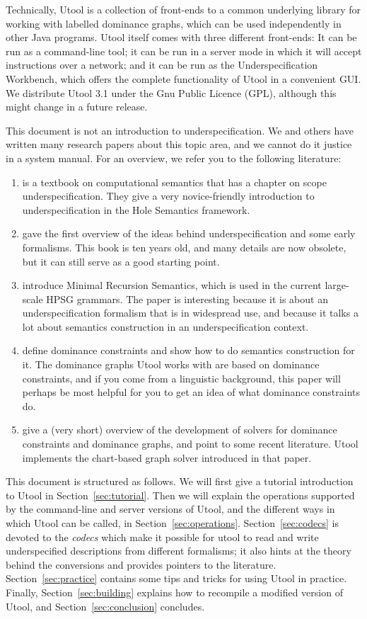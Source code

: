 Technically, Utool is a collection of front-ends to a common
underlying library for working with labelled dominance graphs, which
can be used independently in other Java programs.  Utool itself comes with three different front-ends: It can be run as a command-line tool; it can be run in a server mode in which it will accept instructions over a network; and it can be run as the Underspecification Workbench, which offers the complete functionality of Utool in a convenient GUI. We distribute Utool 3.1 under the Gnu Public Licence
(GPL), although this might change in a future release.

This document is not an introduction to underspecification. We and
others have written many research papers about this topic area, and we
cannot do it justice in a system manual. For an overview, we refer you
to the following literature:
\begin{enumerate}
\item {} is a textbook on computational semantics that has a chapter on scope underspecification. They give a very novice-friendly introduction to underspecification in the Hole Semantics framework.
\item {} gave the first overview of the ideas
behind underspecification and some early formalisms. This book is ten
years old, and many details are now obsolete, but it can still serve
as a good starting point.
\item {} introduce Minimal Recursion Semantics, which
is used in the current large-scale HPSG grammars. The paper is
interesting because it is about an underspecification formalism that
is in widespread use, and because it talks a lot about semantics
construction in an underspecification context.
\item {} define dominance constraints and show how to do
semantics construction for it. The dominance graphs Utool works with
are based on dominance constraints, and if you come from a linguistic
background, this paper will perhaps be most helpful for you to get an
idea of what dominance constraints do.
\item {} give a (very short) overview of the
development of solvers for dominance constraints and dominance graphs,
and point to some recent literature. Utool implements the chart-based
graph solver introduced in that paper.
\end{enumerate}


This document is structured as follows. We will first give a tutorial
introduction to Utool in Section~\ref{sec:tutorial}. Then we will
explain the operations supported by the command-line and server versions of Utool, and the different ways in
which Utool can be called, in
Section~\ref{sec:operations}. Section~\ref{sec:codecs} is devoted to
the \emph{codecs} which make it possible for utool to read and write
underspecified descriptions from different formalisms; it also hints
at the theory behind the conversions and provides pointers to the
literature. Section~\ref{sec:practice} contains some tips and tricks
for using Utool in practice. Finally, Section~\ref{sec:building}
explains how to recompile a modified version of Utool, and
Section~\ref{sec:conclusion} concludes.

